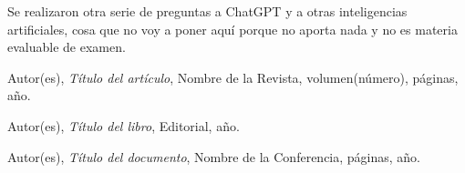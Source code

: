 \documentclass[a4paper,12pt]{article}
\begin{document}
Se realizaron otra serie de preguntas a ChatGPT y a otras inteligencias artificiales, cosa que no voy a poner aquí porque no aporta nada y no es materia evaluable de examen.


\newpage
\begin{thebibliography}{99}
Autor(es), \emph{Título del artículo}, Nombre de la Revista, volumen(número), páginas, año.

Autor(es), \emph{Título del libro}, Editorial, año.

Autor(es), \emph{Título del documento}, Nombre de la Conferencia, páginas, año.
\end{thebibliography}
\end{document}
